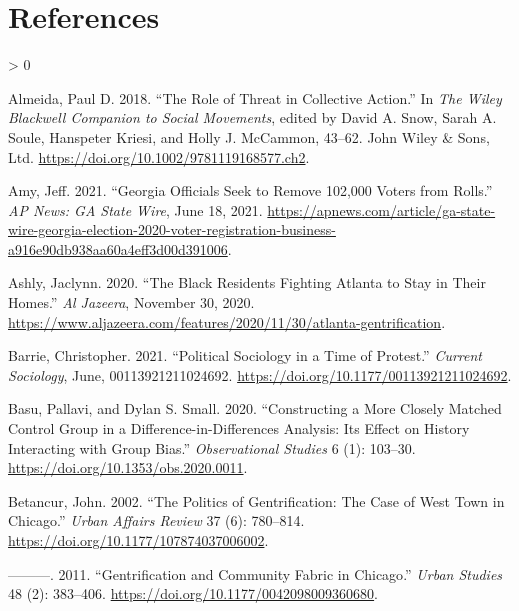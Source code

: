 \documentclass[
  12pt,
]{article}
\newlength{\cslhangindent}
\newenvironment{CSLReferences}[2] %
 {%
  \setlength{\parindent}{0pt}
  \ifodd #1 \everypar{\setlength{\hangindent}{\cslhangindent}}\ignorespaces\fi
  \ifnum #2 > 0
  \setlength{\parskip}{#2\baselineskip}
  \fi
 }%
 {}
\begin{document}
\newpage

\hypertarget{references}{%
\section*{References}\label{references}}

\hypertarget{refs}{}
\begin{CSLReferences}{1}{0}
\leavevmode\hypertarget{ref-Almeida2018}{}%
Almeida, Paul D. 2018. {``The {Role} of {Threat} in {Collective Action}.''} In \emph{The {Wiley Blackwell Companion} to {Social Movements}}, edited by David A. Snow, Sarah A. Soule, Hanspeter Kriesi, and Holly J. McCammon, 43--62. {John Wiley \& Sons, Ltd}. \url{https://doi.org/10.1002/9781119168577.ch2}.

\leavevmode\hypertarget{ref-Amy2021}{}%
Amy, Jeff. 2021. {``Georgia Officials Seek to Remove 102,000 Voters from Rolls.''} \emph{AP News: GA State Wire}, June 18, 2021. \url{https://apnews.com/article/ga-state-wire-georgia-election-2020-voter-registration-business-a916e90db938aa60a4eff3d00d391006}.

\leavevmode\hypertarget{ref-Ashly2020}{}%
Ashly, Jaclynn. 2020. {``The {Black} Residents Fighting {Atlanta} to Stay in Their Homes.''} \emph{Al Jazeera}, November 30, 2020. \url{https://www.aljazeera.com/features/2020/11/30/atlanta-gentrification}.

\leavevmode\hypertarget{ref-Barrie2021}{}%
Barrie, Christopher. 2021. {``Political Sociology in a Time of Protest.''} \emph{Current Sociology}, June, 00113921211024692. \url{https://doi.org/10.1177/00113921211024692}.

\leavevmode\hypertarget{ref-Basu2020}{}%
Basu, Pallavi, and Dylan S. Small. 2020. {``Constructing a {More Closely Matched Control Group} in a {Difference-in-Differences Analysis}: {Its Effect} on {History Interacting} with {Group Bias}.''} \emph{Observational Studies} 6 (1): 103--30. \url{https://doi.org/10.1353/obs.2020.0011}.

\leavevmode\hypertarget{ref-Betancur2002}{}%
Betancur, John. 2002. {``The {Politics} of {Gentrification}: {The Case} of {West Town} in {Chicago}.''} \emph{Urban Affairs Review} 37 (6): 780--814. \url{https://doi.org/10.1177/107874037006002}.

\leavevmode\hypertarget{ref-Betancur2011}{}%
---------. 2011. {``Gentrification and {Community Fabric} in {Chicago}.''} \emph{Urban Studies} 48 (2): 383--406. \url{https://doi.org/10.1177/0042098009360680}.


\end{CSLReferences}
\end{document}
